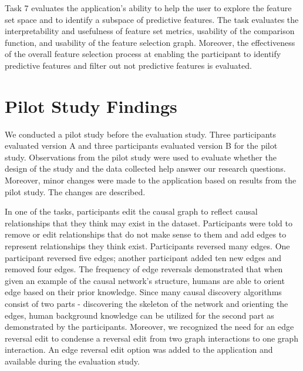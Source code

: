 Task 7 evaluates the application's ability to help the user to explore the feature set space and to identify a subspace of predictive features. The task evaluates the interpretability and usefulness of feature set metrics, usability of the comparison function, and usability of the feature selection graph. Moreover, the effectiveness of the overall feature selection process at enabling the participant to identify predictive features and filter out not predictive features is evaluated. 

\section { Pilot Study Findings }
We conducted a pilot study before the evaluation study. Three participants evaluated version A and three participants evaluated version B for the pilot study. Observations from the pilot study were used to evaluate whether the design of the study and the data collected help answer our research questions. Moreover, minor changes were made to the application based on results from the pilot study. The changes are described.

In one of the tasks, participants edit the causal graph to reflect causal relationships that they think may exist in the dataset. Participants were told to remove or edit relationships that do not make sense to them and add edges to represent relationships they think exist. Participants reversed many edges. One participant reversed five edges; another participant added ten new edges and removed four edges. The frequency of edge reversals demonstrated that when given an example of the causal network's structure, humans are able to orient edge based on their prior knowledge. Since many causal discovery algorithms consist of two parts - discovering the skeleton of the network and orienting the edges, human background knowledge can be utilized for the second part as demonstrated by the participants. Moreover, we recognized the need for an edge reversal edit to condense a reversal edit from two graph interactions to one graph interaction. An edge reversal edit option was added to the application and available during the evaluation study.


